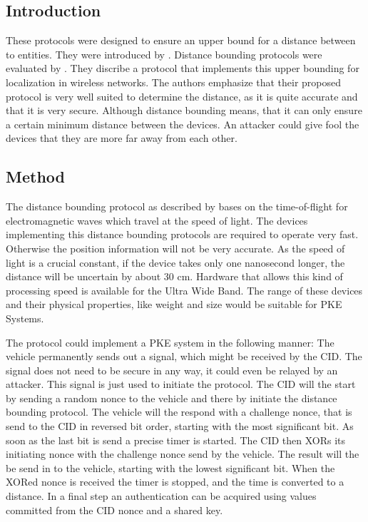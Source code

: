 
\subsection{Introduction}
	These protocols were designed to ensure an upper bound for a distance between to entities.
	They were introduced by \citeauthor{distanceBoundingProtocols}.
	Distance bounding protocols were evaluated by \citeauthor{secPos}.
	They discribe a protocol that implements this upper bounding for localization in wireless networks.
	The authors emphasize that their proposed protocol is very well suited to determine the distance,
	as it is quite accurate and that it is very secure.
	Although distance bounding means,
	that it can only ensure a certain minimum distance between the devices.
	An attacker could give fool the devices that they are more far away from each other.
	
\subsection{Method}
	The distance bounding protocol as described by \citeauthor{secPos}
	bases on the time-of-flight for electromagnetic waves which travel at the speed of light.
	The devices implementing this distance bounding protocols are required to operate very fast.
	Otherwise the position information will not be very accurate.
	As the speed of light is a crucial constant,
	if the device takes only one nanosecond longer,
	the distance will be uncertain by about 30 cm.
	Hardware that allows this kind of processing speed is available for the Ultra Wide Band.
	The range of these devices and their physical properties,
	like weight and size would be suitable for PKE Systems.

	The protocol could implement a PKE system in the following manner:
	The vehicle permanently sends out a signal,
	which might be received by the CID.
	The signal does not need to be secure in any way,
	it could even be relayed by an attacker.
	This signal is just used to initiate the protocol.
	The CID will the start by sending a random nonce to the vehicle
	and there by initiate the distance bounding protocol.
	The vehicle will the respond with a challenge nonce,
	that is send to the CID in reversed bit order,
	starting with the most significant bit.
	As soon as the last bit is send a precise timer is started.
	The CID then XORs its initiating nonce with the challenge nonce send by the vehicle.
	The result will the be send in to the vehicle,
	starting with the lowest significant bit.
	When the XORed nonce is received the timer is stopped,
	and the time is converted to a distance.
	In a final step an authentication can be acquired using values committed from the CID nonce
	and a shared key.

